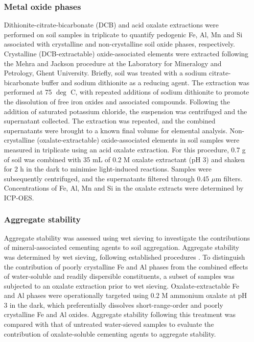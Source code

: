 \documentclass[preprint,12pt]{elsarticle}
\begin{document}
\subsubsection{Metal oxide phases}

Dithionite-citrate-bicarbonate (DCB) and acid oxalate extractions were performed on  soil samples in triplicate to quantify pedogenic Fe, Al, Mn and Si associated with crystalline and non-crystalline soil oxide phases, respectively.
Crystalline (DCB-extractable) oxide-associated elements were extracted following the Mehra and Jackson procedure \citet{Mehra1958}  at the Laboratory for Mineralogy and Petrology, Ghent University. Briefly, soil was treated with a sodium citrate-bicarbonate buffer and sodium dithionite as a reducing agent. The extraction was performed at 75 $\deg$ C, with repeated additions of sodium dithionite to promote the dissolution of free iron oxides and associated compounds. Following the addition of saturated potassium chloride, the suspension was centrifuged and the supernatant collected. The extraction was repeated, and the combined supernatants were brought to a known final volume for elemental analysis. 
Non-crystalline (oxalate-extractable) oxide-associated elements in soil samples were measured in triplicate using an acid oxalate extraction. For this procedure, 0.7 g of soil was combined with 35 mL of 0.2 M oxalate extractant (pH 3) and shaken for 2 h in the dark to minimise light-induced reactions. Samples were subsequently centrifuged, and the supernatants filtered through 0.45 $\mu$m filters. Concentrations of Fe, Al, Mn and Si in the oxalate extracts were determined by ICP-OES.

\subsubsection{Aggregate stability}

Aggregate stability was assessed using wet sieving to investigate the contributions of mineral-associated cementing agents to soil aggregation. Aggregate stability was determined by wet sieving, following established procedures \citep{KemperRosenau2018}. To distinguish the contribution of poorly crystalline Fe and Al phases from the combined effects of water-soluble and readily dispersible constituents, a subset of samples was subjected to an oxalate extraction prior to wet sieving. Oxalate-extractable Fe and Al phases were operationally targeted using 0.2 M ammonium oxalate at pH 3 in the dark, which preferentially dissolves short-range-order and poorly crystalline Fe and Al oxides. Aggregate stability following this treatment was compared with that of untreated water-sieved samples to evaluate the contribution of oxalate-soluble cementing agents to aggregate stability.
\end{document}
